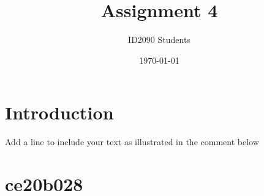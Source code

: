 \documentclass[a4paper, 12pt]{article}
\begin{document}
\title{Assignment 4}
\author{ID2090 Students}
\date{\today}
\maketitle

\tableofcontents

\section{Introduction}
Add a line to include your text as illustrated in the comment below
\section{ce20b028}
 
\end{document}
